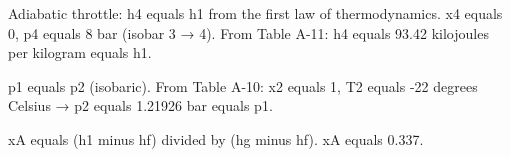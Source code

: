 Adiabatic throttle: h4 equals h1 from the first law of thermodynamics.  
x4 equals 0, p4 equals 8 bar (isobar 3 → 4).  
From Table A-11:  
h4 equals 93.42 kilojoules per kilogram equals h1.  

p1 equals p2 (isobaric).  
From Table A-10:  
x2 equals 1, T2 equals -22 degrees Celsius → p2 equals 1.21926 bar equals p1.  

xA equals (h1 minus hf) divided by (hg minus hf).  
xA equals 0.337.